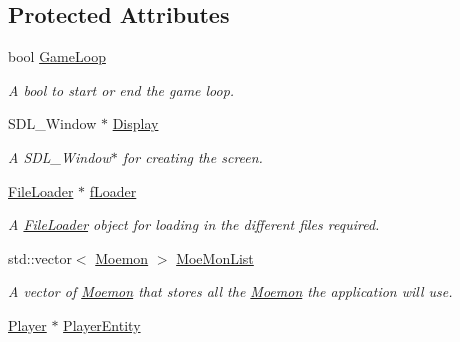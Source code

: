 \subsection*{Protected Attributes}
\begin{DoxyCompactItemize}
\item 
\hypertarget{class_application_ac6112748a352677fa369ead5e3fd7b53}{bool \hyperlink{class_application_ac6112748a352677fa369ead5e3fd7b53}{Game\+Loop}}\label{class_application_ac6112748a352677fa369ead5e3fd7b53}

\begin{DoxyCompactList}\small\item\em A bool to start or end the game loop. \end{DoxyCompactList}\item 
\hypertarget{class_application_a9216c8c03870932d081b5e6fe33e21a8}{S\+D\+L\+\_\+\+Window $\ast$ \hyperlink{class_application_a9216c8c03870932d081b5e6fe33e21a8}{Display}}\label{class_application_a9216c8c03870932d081b5e6fe33e21a8}

\begin{DoxyCompactList}\small\item\em A S\+D\+L\+\_\+\+Window$\ast$ for creating the screen. \end{DoxyCompactList}\item 
\hypertarget{class_application_a6ebb16ce7358f874306c3593fd3abd39}{\hyperlink{class_file_loader}{File\+Loader} $\ast$ \hyperlink{class_application_a6ebb16ce7358f874306c3593fd3abd39}{f\+Loader}}\label{class_application_a6ebb16ce7358f874306c3593fd3abd39}

\begin{DoxyCompactList}\small\item\em A \hyperlink{class_file_loader}{File\+Loader} object for loading in the different files required. \end{DoxyCompactList}\item 
\hypertarget{class_application_aa164b18de54da4097c294b96f65e5dd1}{std\+::vector$<$ \hyperlink{class_moemon}{Moemon} $>$ \hyperlink{class_application_aa164b18de54da4097c294b96f65e5dd1}{Moe\+Mon\+List}}\label{class_application_aa164b18de54da4097c294b96f65e5dd1}

\begin{DoxyCompactList}\small\item\em A vector of \hyperlink{class_moemon}{Moemon} that stores all the \hyperlink{class_moemon}{Moemon} the application will use. \end{DoxyCompactList}\item 
\hypertarget{class_application_a5066daff6377e8577b11ff6706fef9bb}{\hyperlink{class_player}{Player} $\ast$ \hyperlink{class_application_a5066daff6377e8577b11ff6706fef9bb}{Player\+Entity}}\label{class_application_a5066daff6377e8577b11ff6706fef9bb}


\end{DoxyCompactItemize}
